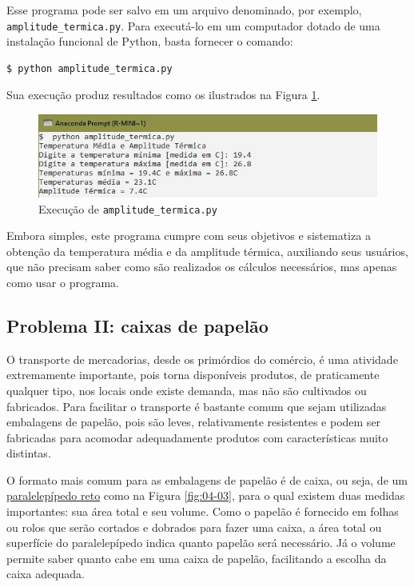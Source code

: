 \documentclass[
]{book}
\begin{document}
Esse programa pode ser salvo em um arquivo denominado, por exemplo, \texttt{amplitude\_termica.py}. Para executá-lo em um computador dotado de uma instalação funcional de Python, basta fornecer o comando:

\begin{verbatim}
$ python amplitude_termica.py
\end{verbatim}

Sua execução produz resultados como os ilustrados na Figura \ref{fig:04-02}.

\begin{figure}
\centering
\includegraphics{images/04-02.jpg}
\caption{\label{fig:04-02}Execução de \texttt{amplitude\_termica.py}}
\end{figure}

Embora simples, este programa cumpre com seus objetivos e sistematiza a obtenção da temperatura média e da amplitude térmica, auxiliando seus usuários, que não precisam saber como são realizados os cálculos necessários, mas apenas como usar o programa.

\hypertarget{seque-e-p-s-caixa}{%
\subsection{Problema II: caixas de papelão}\label{seque-e-p-s-caixa}}

O transporte de mercadorias, desde os primórdios do comércio, é uma atividade extremamente importante, pois torna disponíveis produtos, de praticamente qualquer tipo, nos locais onde existe demanda, mas não são cultivados ou fabricados. Para facilitar o transporte é bastante comum que sejam utilizadas embalagens de papelão, pois são leves, relativamente resistentes e podem ser fabricadas para acomodar adequadamente produtos com características muito distintas.

O formato mais comum para as embalagens de papelão é de caixa, ou seja, de um \href{https://www.todamateria.com.br/paralelepipedo/}{paralelepípedo reto} como na Figura \ref{fig:04-03}, para o qual existem duas medidas importantes: sua área total e seu volume. Como o papelão é fornecido em folhas ou rolos que serão cortados e dobrados para fazer uma caixa, a área total ou superfície do paralelepípedo indica quanto papelão será necessário. Já o volume permite saber quanto cabe em uma caixa de papelão, facilitando a escolha da caixa adequada.
\end{document}
